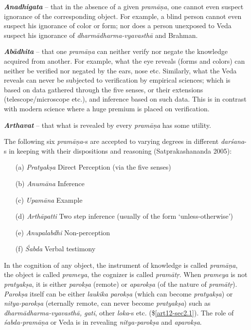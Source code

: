 {{\sl\bfseries Anadhigata}\relax}  -- that in the absence of a given {\sl pramāṇa}, one cannot even suspect ignorance of the corresponding object. For example, a blind person cannot even suspect his ignorance of color or form; nor does a person unexposed to Veda suspect his ignorance of {\sl dharmādharma-vyavasthā} and Brahman.

{{\sl\bfseries Abādhita}\relax} -- that one {\sl pramāṇa} can neither verify nor negate the knowledge acquired from another. For example, what the eye reveals (forms and colors) can neither be veriﬁed nor negated by the ears, nose etc. Similarly, what the Veda reveals can never be subjected to veriﬁcation by empirical sciences; which is based on data gathered through the ﬁve senses, or their extensions (telescope/microscope etc.), and inference based on such data. This is in contrast with modern science where a huge premium is placed on veriﬁcation.

{{\sl\bfseries Arthavat}\relax} -- that what is revealed by every {\sl pramāṇa} has some utility. 

The following six {\sl pramāṇa}-s are accepted to varying degrees in different {\sl darśana}-s in keeping with their dispositions and reasoning (Satprakashananda 2005):
\begin{itemize}
\item[(a)] {\sl Pratyakṣa}  Direct Perception (via the five senses)

\item[(b)] {\sl Anumāna} Inference

\item[(c)] {\sl Upamāna} Example

\item[(d)] {\sl Arthāpatti} Two step inference (usually of the form `unless-otherwise')

\item[(e)] {\sl Anupalabdhi} Non-perception

\item[(f)] {\sl Śabda} Verbal testimony
\end{itemize}

In the cognition of any object, the instrument of knowledge is called {\sl pramāṇa}, the object is called {\sl prameya}, the cognizer is called {\sl pramātṛ}. When {\sl prameya} is not {\sl pratyakṣa}, it is either {\sl parokṣa} (remote) or {\sl aparokṣa} (of the nature of {\sl pramātṛ}). {\sl Parokṣa} itself can be either {\sl laukika parokṣa} (which can become {\sl pratyakṣa}) or {\sl nitya-parokṣa} (eternally remote, can never become {\sl pratyakṣa}) such as {\sl dharmādharma-vyavasthā, gati}, other {\sl loka}-s etc. (\$\ref{art12-sec2.1}). The role of {\sl śabda-pramāṇa} or Veda is in revealing {\sl nitya-parokṣa} and {\sl aparokṣa}.

